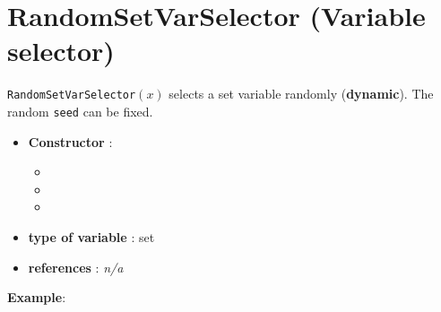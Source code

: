 \section{RandomSetVarSelector (Variable selector)}\label{randomvarset:randomvarsetvarselector}\hypertarget{randomvarset:randomvarsetvarselector}{}
\begin{notedef}
  \texttt{RandomSetVarSelector}$(x)$ selects a set variable randomly (\textbf{dynamic}). The random \texttt{seed} can be fixed.
\end{notedef}

\begin{itemize}
	\item \textbf{Constructor} : 
	\begin{itemize}
	\item {}
	\item {}
	\item {}
	\end{itemize}	
	\item \textbf{type of variable} : set
	\item \textbf{references} : \emph{n/a}
\end{itemize}

\textbf{Example}:
%

